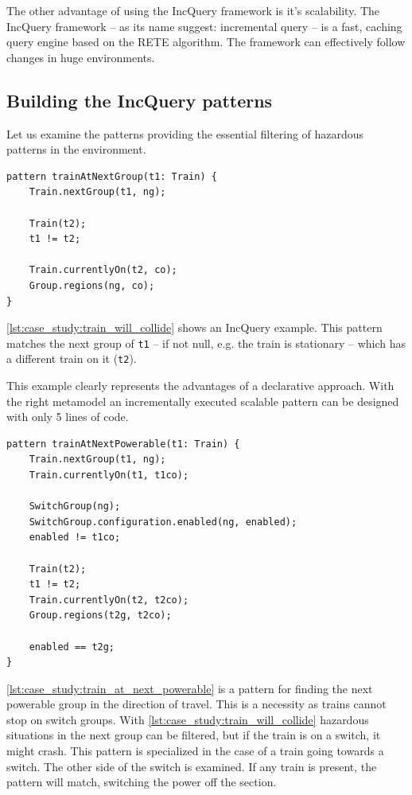 The other advantage of using the IncQuery framework is it's scalability. The IncQuery framework -- as its name suggest: incremental query -- is a fast, caching query engine based on the RETE algorithm. The framework can effectively follow changes in huge environments. 

\subsection{Building the IncQuery patterns}
\label{sec:case_study:pattern_building}

Let us examine the patterns providing the essential filtering of hazardous patterns in the environment.
\\[1ex]

\begin{lstlisting}[caption={Collision detection},label=lst:case_study:train_will_collide]
pattern trainAtNextGroup(t1: Train) {
	Train.nextGroup(t1, ng);
	
	Train(t2);
	t1 != t2;
	
	Train.currentlyOn(t2, co);
	Group.regions(ng, co);
}
\end{lstlisting}

\cref{lst:case_study:train_will_collide} shows an IncQuery example. This pattern matches  the next group of \verb+t1+ -- if not null, e.g. the train is stationary -- which has a different train on it (\verb+t2+).

This example clearly represents the advantages of a declarative approach. With the right metamodel an incrementally executed scalable pattern can be designed with only 5 lines of code.
\\[1ex]

\begin{lstlisting}[caption={Collision detection},label=lst:case_study:train_at_next_powerable]
pattern trainAtNextPowerable(t1: Train) {
	Train.nextGroup(t1, ng);
	Train.currentlyOn(t1, t1co);
	
	SwitchGroup(ng);
	SwitchGroup.configuration.enabled(ng, enabled);
	enabled != t1co;
	
	Train(t2);
	t1 != t2;
	Train.currentlyOn(t2, t2co);
	Group.regions(t2g, t2co);
	
	enabled == t2g;
}
\end{lstlisting}

\newpage
\cref{lst:case_study:train_at_next_powerable} is a pattern for finding the next powerable group in the direction of travel. This is a necessity as trains cannot stop on switch groups. With \cref{lst:case_study:train_will_collide} hazardous situations in the next group can be filtered, but if the train is on a switch, it might crash. This pattern is specialized in the case of a train going towards a switch. The other side of the switch is examined. If any train is present, the pattern will match, switching the power off the section.
\\[1ex]

